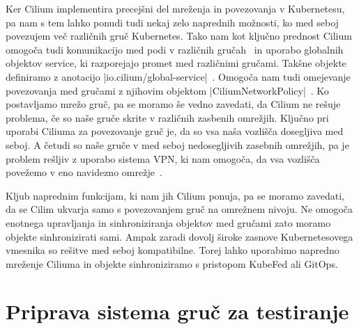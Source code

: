 \documentclass[a4paper, 12pt]{book}
\begin{document}
Ker Cilium implementira precejšni del mreženja in povezovanja v Kubernetesu, pa nam s tem lahko ponudi tudi nekaj zelo naprednih možnosti, ko med seboj povezujem več različnih gruč Kubernetes.
Tako nam kot ključno prednost Cilium omogoča tudi komunikacijo med podi v različnih gručah~\cite{cilium-cluster-mesh} in uporabo globalnih objektov service, ki razporejajo promet med različnimi gručami.
Takšne objekte definiramo z anotacijo \spverb|io.cilium/global-service|~\cite{setup-cilium-cluster-mesh}.
Omogoča nam tudi omejevanje povezovanja med gručami z njihovim objektom \spverb|CiliumNetworkPolicy|~\cite{setup-cilium-cluster-mesh}.
Ko postavljamo mrežo gruč, pa se moramo še vedno zavedati, da Cilium ne rešuje problema, če so naše gruče skrite v različnih zasbenih omrežjih.
Ključno pri uporabi Ciliuma za povezovanje gruč je, da so vsa naša vozlišča dosegljiva med seboj.
A četudi so naše gruče v med seboj nedosegljivih zasebnih omrežjih, pa je problem rešljiv z uporabo sistema VPN, ki nam omogoča, da vsa vozlišča povežemo v eno navidezno omrežje~\cite{setup-cilium-cluster-mesh}.

Kljub naprednim funkcijam, ki nam jih Cilium ponuja, pa se moramo zavedati, da se Cilim ukvarja samo s povezovanjem gruč na omrežnem nivoju.
Ne omogoča enotnega upravljanja in sinhroniziranja objektov med gručami zato moramo objekte sinhronizirati sami.
Ampak zaradi dovolj široke zasnove Kubernetesovega vmesnika so rešitve med seboj kompatibilne.
Torej lahko uporabimo napredno mreženje Ciliuma in objekte sinhroniziramo s pristopom KubeFed ali GitOps.
\chapter{Priprava sistema gruč za testiranje}
\end{document}
